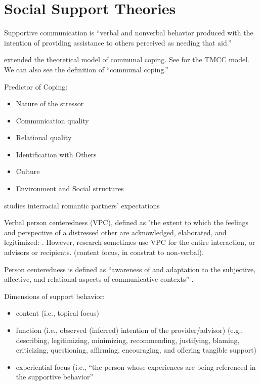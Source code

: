 \documentclass[
]{book}
\providecommand{\tightlist}{%
  \setlength{\itemsep}{0pt}\setlength{\parskip}{0pt}}
\begin{document}
\hypertarget{social-support-theories}{%
\section{Social Support Theories}\label{social-support-theories}}

Supportive communication is ``verbal and nonverbal behavior produced with the intention of providing assistance to others
perceived as needing that aid.'' \citep[pp.317]{MacGeorge_2011}

\citep{Afifi_2020} extended the theoretical model of communal coping. See \citep[pp.~426]{Afifi_2020} for the TMCC model. We can
also see the definition of ``communal coping.''

Predictor of Coping:

\begin{itemize}
\tightlist
\item
  Nature of the stressor
\item
  Communication quality
\item
  Relational quality
\item
  Identification with Others
\item
  Culture
\item
  Environment and Social structures
\end{itemize}

\citep[pp.~199]{Brummett_2019} studies interracial romantic partners' expectations

Verbal person centeredness (VPC), defined as "the extent to which the feelings and perspective of a distressed other are
acknowledged, elaborated, and legitimized: \citep{MacGeorge_2018}. However, research sometimes use VPC for the entire
interaction, or advisors or recipients. (content focus, in constrat to non-verbal).

Person centeredness is defined as ``awareness of and adaptation to the subjective, affective, and relational aspects of
communicative contexts'' \citep[pp.~249]{burleson_1998}.

Dimensions of support behavior:

\begin{itemize}
\item
  content (i.e., topical focus)
\item
  function (i.e., observed (inferred) intention of the provider/advisor) (e.g., describing, legitimizing, minimizing,
  recommending, justifying, blaming, criticizing, questioning, affirming, encouraging, and offering tangible support)
\item
  experiential focus (i.e., ``the person whose experiences are being referenced in the supportive behavior''
  \citep[pp.~153]{MacGeorge_2018}
\end{itemize}
\end{document}
